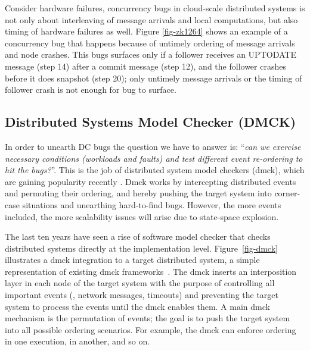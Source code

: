 Consider hardware failures, concurrency bugs in cloud-scale distributed systems
is not only about interleaving of message arrivals and local computations, but
also timing of hardware failures as well. Figure \ref{fig-zk1264} shows an
example of a concurrency bug that happens because of untimely ordering of
message arrivals and node crashes. This bugs surfaces only if a follower
receives an UPTODATE message (step 14) after a commit message (step 12), and the
follower crashes before it does snapshot (step 20); only untimely message
arrivals or the timing of follower crash is not enough for bug to surface.

\subsection{Distributed Systems Model Checker (DMCK)}
\label{sec-bg-dmck}

In order to unearth DC bugs the question we have to answer is: ``{\em can we
exercise necessary conditions (\ie workloads and faults) and test different
event re-ordering to hit the bugs?}''. This is the job of distributed system
model checkers (dmck), which are gaining popularity recently
\cite{Guo+11-Demeter, Killian+07-LifeDeathMaceMC, Simsa+10-Dbug,
Yang+09-Modist}. Dmck works by intercepting distributed events and permuting
their ordering, and hereby pushing the target system into corner-case situations
and unearthing hard-to-find bugs. However, the more events included, the more
scalability issues will arise due to state-space explosion.


The last ten years have seen a rise of software model checker that checks
distributed systems directly at the implementation level.  Figure~\ref{fig-dmck}
illustrates a dmck integration to a target distributed system, a simple
representation of existing dmck frameworks~\cite{Guo+11-Demeter,
Killian+07-LifeDeathMaceMC, Simsa+10-Dbug, Yang+09-Modist}.  The dmck inserts an
interposition layer in each node of the target system with the purpose of
controlling all important events (\eg, network messages, timeouts) and
preventing the target system to process the events until the dmck enables them.
A main dmck mechanism is the permutation of events; the goal is to push the
target system into all possible ordering scenarios.  For example, the dmck can
enforce  ordering in one execution,  in another, and so on.

